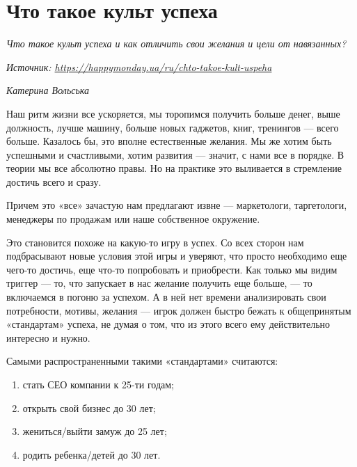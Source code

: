 
\section{Что такое культ успеха}

\textit{Что такое культ успеха и как отличить свои желания и цели от навязанных?}

\textit{Источник: \url{https://happymonday.ua/ru/chto-takoe-kult-uspeha}}

\textit{Катерина Вольська}

Наш ритм жизни все ускоряется, мы торопимся получить больше денег, выше должность, лучше машину, больше новых гаджетов, книг, тренингов — всего больше. Казалось бы, это вполне естественные желания. Мы же хотим быть успешными и счастливыми, хотим развития — значит, с нами все в порядке. В теории мы все абсолютно правы. Но на практике это выливается в стремление достичь всего и сразу.

\begin{fancyquotes}
    Причем это «все» зачастую нам предлагают извне  — маркетологи, таргетологи, менеджеры по продажам или наше собственное окружение.
\end{fancyquotes}

Это становится похоже на какую-то игру в успех. Со всех сторон нам подбрасывают новые условия этой игры и уверяют, что просто необходимо еще чего-то достичь, еще что-то попробовать и приобрести. Как только мы видим триггер — то, что запускает в нас желание получить еще больше, — то включаемся в погоню за успехом. А в ней нет времени анализировать свои потребности, мотивы, желания — игрок должен быстро бежать к общепринятым «стандартам» успеха, не думая о том, что из этого всего ему действительно интересно и нужно.

Самыми распространенными такими «стандартами» считаются:

\begin{enumerate}
    \item стать СЕО компании к 25-ти годам;
    \item открыть свой бизнес до 30 лет;
    \item жениться/выйти замуж до 25 лет;
    \item родить ребенка/детей до 30 лет.
\end{enumerate}

